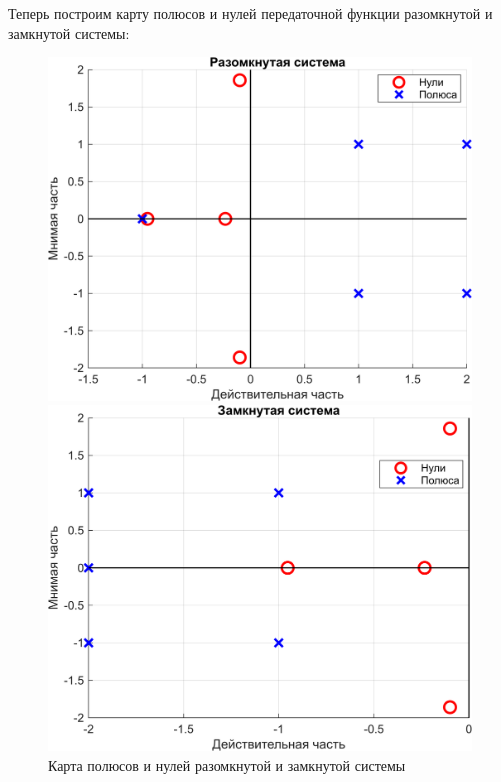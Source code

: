 Теперь построим карту полюсов и нулей передаточной функции разомкнутой и замкнутой системы:
\begin{figure}[H]
    \centering
    \begin{minipage}{0.45\textwidth}
        \centering
        \includegraphics[width=1\textwidth, trim={0cm 0cm 0cm 0cm}]{../images/1_3_map_ol.png}
    \end{minipage}
    \hfill
    \begin{minipage}{0.45\textwidth}
        \centering
        \includegraphics[width=1\textwidth, trim={0cm 0cm 0cm 0cm}]{../images/1_3_map_cl.png}
    \end{minipage}
    \caption{Карта полюсов и нулей разомкнутой и замкнутой системы}
\end{figure}

